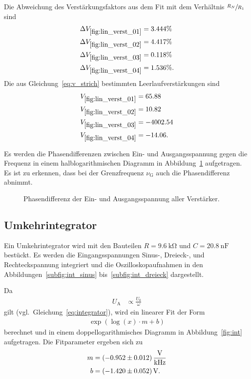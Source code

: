 Die Abweichung des Verstärkungsfaktors aus dem Fit mit dem Verhältnis $\sfrac{R_N}{R_1}$
sind
\begin{align*}
  \Delta V_{\ref{fig:lin_verst_01}} &= \num{3.444}\% \\
  \Delta V_{\ref{fig:lin_verst_02}} &= \num{4.417}\% \\
  \Delta V_{\ref{fig:lin_verst_03}} &= \num{0.118}\% \\
  \Delta V_{\ref{fig:lin_verst_04}} &= \num{1.536}\%.
\end{align*}
Die aus Gleichung~\eqref{eq:v_strich} bestimmten Leerlaufverstärkungen sind
\begin{align*}
  V_{\ref{fig:lin_verst_01}} &= \num{65.88} \\
  V_{\ref{fig:lin_verst_02}} &= \num{10.82} \\
  V_{\ref{fig:lin_verst_03}} &= \num{-4002.54} \\
  V_{\ref{fig:lin_verst_04}} &= \num{-14.06}.
\end{align*}

Es werden die Phasendifferenzen zwischen Ein- und Ausgangsspannung gegen die Frequenz
in einem halblogarithmischen Diagramm in Abbildung~\ref{fig:phasendiff} aufgetragen.
Es ist zu erkennen, dass bei der Grenzfrequenz $\nu_\text{G}$ auch die Phasendifferenz abnimmt.

\begin{figure}[ht]
  \centering
  
  \caption{Phasendifferenz der Ein- und Ausgangsspannung aller Verstärker.}
  \label{fig:phasendiff}
\end{figure}

\FloatBarrier
\subsection{Umkehrintegrator}
Ein Umkehrintegrator wird mit den Bauteilen $R = \SI{9.6}{\kilo\ohm}$ und $C = \SI{20.8}{\nano\farad}$ bestückt.
Es werden die Eingangsspannungen Sinus-, Dreieck-, und Rechteckspannung integriert und die Oszilloskopaufnahmen in den Abbildungen~\ref{subfig:int_sinus} bis~\ref{subfig:int_dreieck} dargestellt.

Da
\begin{align*}
  U_\text{A} &\propto \frac{U_0}{\omega}
\end{align*}
gilt (vgl.\ Gleichung~\eqref{eq:integrator}),
wird ein linearer Fit der Form
\begin{align*}
  \exp{\left(\log{\left(x\right)} \cdot m + b\right)}
\end{align*}
berechnet und in einem doppellogarithmisches Diagramm in Abbildung~\ref{fig:int} aufgetragen.
Die Fitparameter ergeben sich zu
\begin{align*}
  m &= \SI{-0.952 \pm 0.012}{\volt\per\kilo\hertz} \\
  b &= \SI{-1.42 \pm 0.052}{\volt}.
\end{align*}


